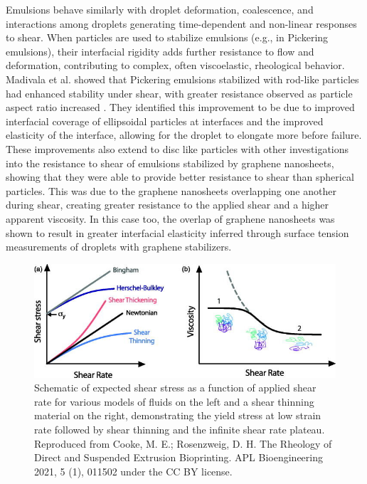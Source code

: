Emulsions behave similarly with droplet deformation, coalescence, and interactions 
among droplets generating time-dependent and non-linear responses to shear. When particles are used to stabilize emulsions (e.g., in Pickering emulsions), their interfacial rigidity 
adds further resistance to flow and deformation, contributing to complex, often viscoelastic, rheological behavior.
Madivala et al. showed that Pickering emulsions stabilized with rod-like particles had enhanced stability under shear, with greater resistance observed as particle aspect ratio increased 
\cite{madivala_exploiting_2009}. They identified this improvement to be due to improved interfacial coverage of ellipsoidal particles at interfaces and the improved elasticity of the interface,
allowing for the droplet to elongate more before failure. These improvements also extend to disc like particles with other investigations into the resistance to shear of emulsions stabilized by
graphene nanosheets, showing that they were able to provide better resistance to shear than spherical particles. \cite{imperiali_simple_2014} This was due to the graphene nanosheets overlapping one
another during shear, creating greater resistance to the applied shear and a higher apparent viscosity. In this case too, the overlap of graphene nanosheets was shown to result in greater interfacial
elasticity inferred through surface tension measurements of droplets with graphene stabilizers. \cite{sun_assembly_2013}

\begin{figure}
    \centering
    \includegraphics[scale = 4]{../figures/literature_review/Flow-curves.png}
    \caption{Schematic of expected shear stress as a function of applied shear rate for various models of fluids on the left and a shear thinning material on the right, demonstrating
             the yield stress at low strain rate followed by shear thinning and the infinite shear rate plateau. Reproduced from Cooke, M. E.; Rosenzweig, D. H. The Rheology of Direct 
             and Suspended Extrusion Bioprinting. APL Bioengineering 2021, 5 (1), 011502 under the CC BY license.}
    \label{fig:shear_theory}
\end{figure}

